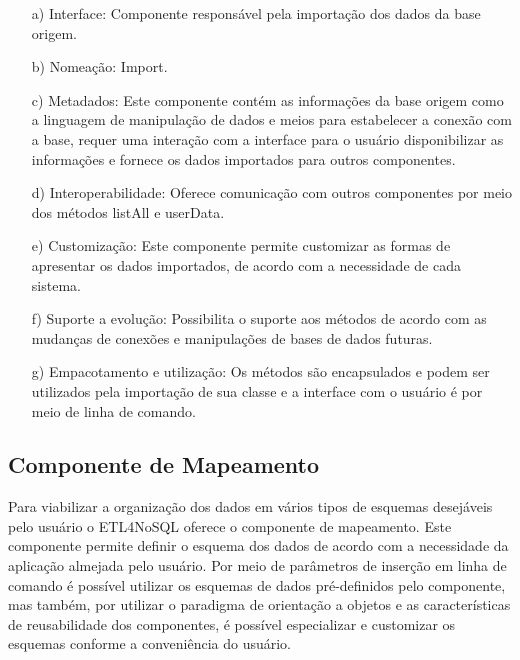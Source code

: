 \begin{itemize}
	\item[a)] Interface: Componente responsável pela importação dos dados da base origem.
	
	\item[b)] Nomeação: Import.
	
	\item[c)] Metadados: Este componente contém as informações da base origem como a linguagem de manipulação de dados e meios para estabelecer a conexão com a base, requer uma interação com a interface para o usuário disponibilizar as informações e fornece os dados importados para outros componentes.
	
	\item[d)] Interoperabilidade: Oferece comunicação com outros componentes por meio dos métodos listAll e userData.
	
	
	
	\item[e)] Customização: Este componente permite customizar as formas de apresentar os dados importados, de acordo com a necessidade de cada sistema.
	
	\item[f)] Suporte a evolução: Possibilita o suporte aos métodos de acordo com as mudanças de conexões e manipulações de bases de dados futuras.
	
	\item[g)] Empacotamento e utilização: Os métodos são encapsulados e podem  ser utilizados pela importação de sua classe e a interface com o usuário é por meio de linha de comando.
	
\end{itemize}

\subsection{Componente de Mapeamento}

Para viabilizar a organização dos dados em vários tipos de esquemas desejáveis pelo usuário o ETL4NoSQL oferece o componente de mapeamento. Este componente permite definir o esquema dos dados de acordo com a necessidade da aplicação almejada pelo usuário. Por meio de parâmetros de inserção em linha de comando é possível utilizar os esquemas de dados pré-definidos pelo componente, mas também, por utilizar o paradigma de orientação a objetos e as características de reusabilidade dos componentes, é possível especializar e customizar os esquemas conforme a conveniência do usuário.

